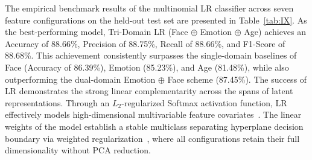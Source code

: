 The empirical benchmark results of the multinomial LR classifier across seven feature configurations on the held-out test set are presented in Table~\ref{tab:IX}. As the best-performing model, Tri-Domain LR (Face $\oplus$ Emotion $\oplus$ Age) achieves an Accuracy of 88.66\%, Precision of 88.75\%, Recall of 88.66\%, and F1-Score of 88.68\%. This achievement consistently surpasses the single-domain baselines of Face (Accuracy of 86.39\%), Emotion (85.23\%), and Age (81.48\%), while also outperforming the dual-domain Emotion $\oplus$ Face scheme (87.45\%). The success of LR demonstrates the strong linear complementarity across the spans of latent representations. Through an $L_2$-regularized Softmax activation function, LR effectively models high-dimensional multivariable feature covariates~\cite{ref49}. The linear weights of the model establish a stable multiclass separating hyperplane decision boundary via weighted regularization~\cite{ref50}, where all configurations retain their full dimensionality without PCA reduction.

